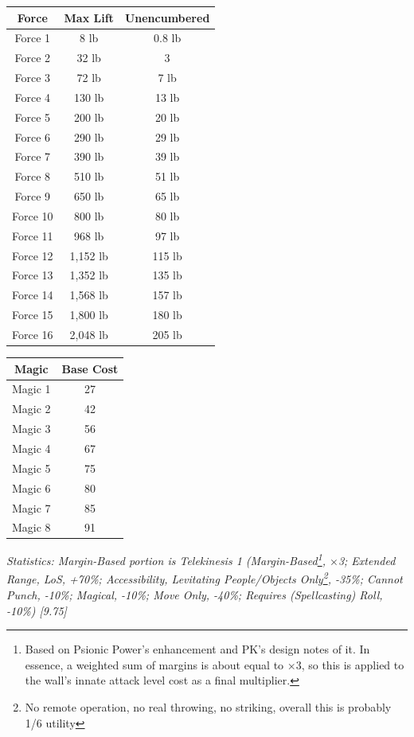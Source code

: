 \begin{multicols*}{3}
	\begin{center}
		\begin{tabular}{|c|c|c|}
			\hline
			Force & Max Lift & Unencumbered\\
			\hline
			\hline
			Force 1 & 8 lb & 0.8 lb \\
			Force 2 & 32 lb & 3 \\
			Force 3 & 72 lb & 7 lb \\
			Force 4 & 130 lb & 13 lb \\
			Force 5 & 200 lb & 20 lb \\
			Force 6 & 290 lb & 29 lb \\
			Force 7 & 390 lb & 39 lb \\
			Force 8 & 510 lb & 51 lb \\
			Force 9 & 650 lb & 65 lb \\
			Force 10 & 800 lb & 80 lb \\
			Force 11 & 968 lb & 97 lb \\
			Force 12 & 1,152 lb & 115 lb \\
			Force 13 & 1,352 lb & 135 lb \\
			Force 14 & 1,568 lb & 157 lb \\
			Force 15 & 1,800 lb & 180 lb \\
			Force 16 & 2,048 lb & 205 lb \\
			\hline
		\end{tabular}
	\end{center}
	
	\begin{center}
		\begin{tabular}{|c|c|}
			\hline
			Magic & Base Cost \\
			\hline
			\hline
			Magic 1 & 27 \\
			Magic 2 & 42 \\
			Magic 3 & 56 \\
			Magic 4 & 67 \\
			Magic 5 & 75 \\
			Magic 6 & 80 \\
			Magic 7 & 85 \\
			Magic 8 & 91 \\
			\hline
		\end{tabular}
	\end{center}
	
	\textcolor{OliveGreen}{\textit{Statistics: Margin-Based portion is Telekinesis 1 (Margin-Based\footnote{Based on Psionic Power’s enhancement and PK’s design notes of it. In essence, a weighted sum of margins is about equal to ×3, so this is applied to the wall’s innate attack level cost as a final multiplier.}, $\times$3; Extended Range, LoS, +70\%; Accessibility, Levitating People/Objects Only\footnote{No remote operation, no real throwing, no striking, overall this is probably 1/6 utility}, -35\%; Cannot Punch, -10\%; Magical, -10\%; Move Only, -40\%; Requires (Spellcasting) Roll, -10\%) [9.75] }}
	

\end{multicols*}
